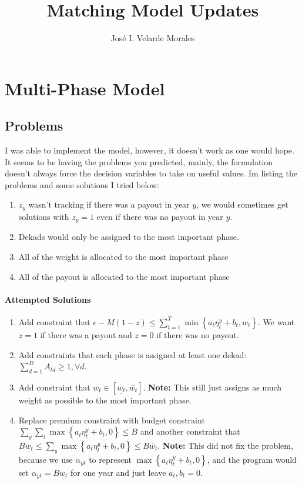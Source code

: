 \documentclass[11pt]{article}
\title{Matching Model Updates}
\author{José I. Velarde Morales}
\begin{document}
\maketitle

\section{Multi-Phase Model} \label{limited-data}
  \subsection{Problems}
    I was able to implement the model, however, it doesn't work as one would hope. It seems to be having the problems you predicted, mainly, the formulation doesn't always force the decision variables to take on useful values. Im listing the problems and some solutions I tried below: 
    \begin{enumerate}
        \item $z_y$ wasn't tracking if there was a payout in year $y$, we would sometimes get solutions with $z_y=1$ even if there was no payout in year $y$. 
        \item Dekads would only be assigned to the most important phase. 
        \item All of the weight is allocated to the most important phase
        \item All of the payout is allocated to the most important phase
    \end{enumerate}

    \paragraph{Attempted Solutions} 
    \begin{enumerate}
        \item Add constraint that $\epsilon -M(1-z) \leq \sum_{t=1}^{T} \min \left \{ a_t \eta^y_t + b_t, w_t \right \}$. We want $z=1$ if there was a payout and $z=0$ if there was no payout. 
        \item Add constraints that each phase is assigned at least one dekad: $\sum_{d=1}^{D} A_{td} \geq 1, \forall d$. 
        \item Add constraint that $w_t \in [\underline{w_t},\overline{w_t}]$. \textbf{Note:} This still just assigns as much weight as possible to the most important phase. 
        \item Replace premium constraint with budget constraint $\sum_y \sum_t \max \left \{ a_t \eta^y_t + b_t,0 \right \} \leq B$ and another constraint that $B\underline{w_t} \leq \sum_y \max \left \{ a_t \eta^y_t + b_t,0 \right \} \leq B \overline{w_t}$. \textbf{Note:} This did not fix the problem, because we use $\alpha_{yt}$ to represent $\max \left \{ a_t \eta^y_t + b_t,0 \right \}$, and the program would set $\alpha_{yt} = B\underline{w_t}$ for one year and just leave $a_t, b_t = 0$. 
    \end{enumerate}
\end{document}
